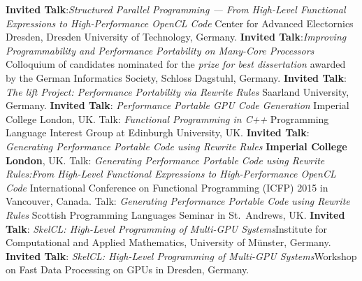 \documentclass[11pt,a4paper]{moderncv}
\newcommand{\strong}[1]{\textcolor{color1}{\textbf{#1}}}
\begin{document}
         {\strong{Invited Talk}:\newline \emph{Structured Parallel Programming --- From High-Level Functional Expressions to High-Performance OpenCL Code}\newline
         Center for Advanced Electornics Dresden, Dresden University of Technology, Germany.
         }
         {\strong{Invited Talk}:\newline \emph{Improving Programmability and Performance Portability on Many-Core Processors}\newline
         \small Colloquium of candidates nominated for the \emph{prize for best dissertation} awarded by the German Informatics Society, Schloss Dagstuhl, Germany.}
         {\strong{Invited Talk}: \emph{The lift Project: Performance Portability via Rewrite Rules}\newline
          \small Saarland University, Germany.}
         {\strong{Invited Talk}: \emph{Performance Portable GPU Code Generation}\newline
         \small Imperial College London, UK.}
         {Talk: \emph{Functional Programming in C++}\newline
         \small Programming Language Interest Group at Edinburgh University, UK.}
         {\strong{Invited Talk}: \emph{Generating Performance Portable Code using Rewrite Rules}\newline
         \small \strong{Imperial College London}, UK.}
         {Talk: \emph{Generating Performance Portable Code using Rewrite Rules:\newline From High-Level Functional Expressions to High-Performance OpenCL Code}\newline
         \small International Conference on Functional Programming (ICFP) 2015 in Vancouver, Canada.}
         {Talk: \emph{Generating Performance Portable Code using Rewrite Rules}\newline
         \small Scottish Programming Languages Seminar in St.\ Andrews, UK.}
         {\strong{Invited Talk}: \emph{SkelCL\@: High-Level Programming of Multi-GPU
          Systems}\newline \small Institute for Computational and Applied
          Mathematics, University of Münster, Germany.}
         {\strong{Invited Talk}: \emph{SkelCL\@: High-Level Programming of Multi-GPU
          Systems}\newline \small Workshop on Fast Data Processing on GPUs in
          Dresden, Germany.}
\end{document}
